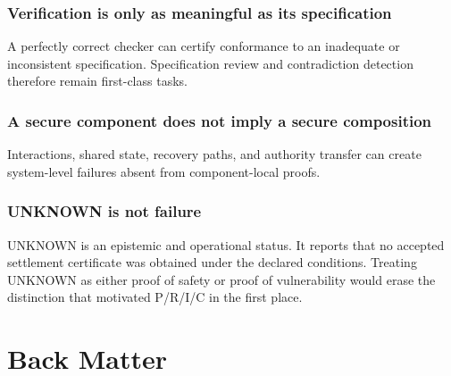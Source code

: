 \documentclass[11pt,oneside]{book}
\theoremstyle{definition}
\theoremstyle{remark}
\begin{document}
\section{Verification is only as meaningful as its specification}
A perfectly correct checker can certify conformance to an inadequate or inconsistent specification. Specification review and contradiction detection therefore remain first-class tasks.

\section{A secure component does not imply a secure composition}
Interactions, shared state, recovery paths, and authority transfer can create system-level failures absent from component-local proofs.

\section{UNKNOWN is not failure}
UNKNOWN is an epistemic and operational status. It reports that no accepted settlement certificate was obtained under the declared conditions. Treating UNKNOWN as either proof of safety or proof of vulnerability would erase the distinction that motivated P/R/I/C in the first place.

\appendix
\part{Back Matter}
\end{document}
